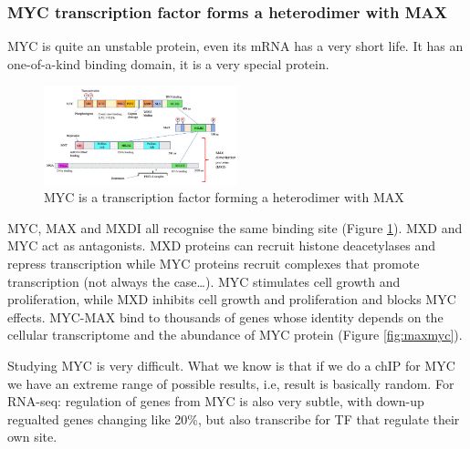 \hypertarget{myc-transcription-factor-forms-a-heterodimer-with-max}{%
\subsubsection{MYC transcription factor forms a heterodimer with MAX}\label{myc-transcription-factor-forms-a-heterodimer-with-max}}

MYC is quite an unstable protein, even its mRNA has a very short life. It has an one-of-a-kind binding domain, it is a very special protein.

\begin{figure}
\centering
\includegraphics[width=0.5\textwidth]{../_resources/01adbb32a69ee3baec1bf9bddd890f52.png}
\caption{ MYC is a transcription factor forming a heterodimer with MAX}
\label{fig:myc}
\end{figure}

MYC, MAX and MXDI all recognise the same binding site (Figure \ref{fig:myc}).
MXD and MYC act as antagonists. MXD proteins can recruit histone deacetylases and repress transcription while MYC proteins recruit complexes that promote transcription (not always the case\ldots). MYC stimulates cell growth and proliferation, while MXD inhibits cell growth and proliferation and blocks MYC effects.
MYC-MAX bind to thousands of genes whose identity depends on the cellular transcriptome and the abundance of MYC protein (Figure \ref{fig:maxmyc}).

Studying MYC is very difficult. What we know is that if we do a chIP for MYC we have an extreme range of possible results, i.e, result is basically random. For RNA-seq: regulation of genes from MYC is also very subtle, with down-up regualted genes changing like 20\%, but also transcribe for TF that regulate their own site.

